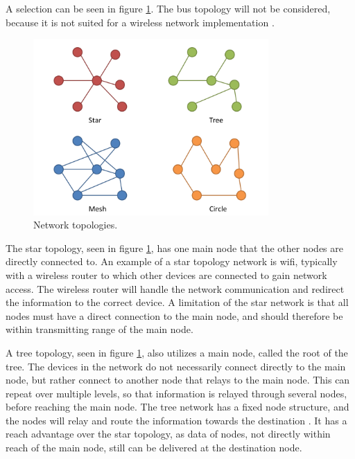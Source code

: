A selection can be seen in figure \ref{fig:topologies}. The bus topology will not be considered, because it is not suited for a wireless network implementation \cite{engst2003wireless}. 

\begin{figure}[h!]
	\centering
	\includegraphics[width=0.8\textwidth]{figures/topologies.png}
	\caption{Network topologies.}
	\label{fig:topologies}
\end{figure}

The star topology, seen in figure \ref{fig:topologies}, has one main node that the other nodes are directly connected to. An example of a star topology network is wifi, typically with a wireless router to which other devices are connected to gain network access. The wireless router will handle the network communication and redirect the information to the correct device. A limitation of the star network is that all nodes must have a direct connection to the main node, and should therefore be within transmitting range of the main node. %

A tree topology, seen in figure \ref{fig:topologies}, also utilizes a main node, called the root of the tree. The devices in the network do not necessarily connect directly to the main node, but rather connect to another node that relays to the main node. This can repeat over multiple levels, so that information is relayed through several nodes, before reaching the main node. The tree network has a fixed node structure, and the nodes will relay and route the information towards the destination \cite{kizza2015guide}. It has a reach advantage over the star topology, as data of nodes, not directly within reach of the main node, still can be delivered at the destination node.


